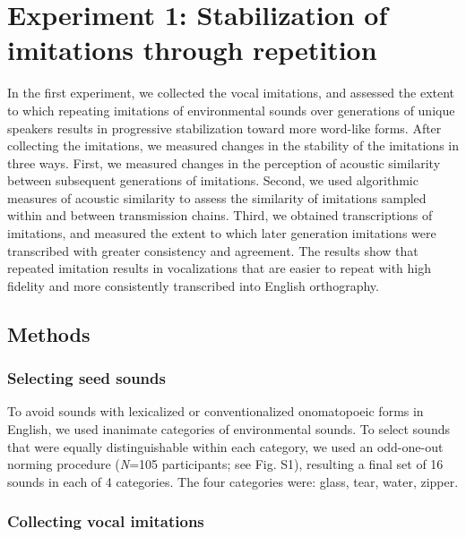 \documentclass[english,floatsintext,man]{apa6}
\theoremstyle{definition}
\theoremstyle{definition}
\theoremstyle{definition}
\theoremstyle{remark}
\begin{document}
\hypertarget{experiment-1-stabilization-of-imitations-through-repetition}{%
\section{Experiment 1: Stabilization of imitations through
repetition}\label{experiment-1-stabilization-of-imitations-through-repetition}}

In the first experiment, we collected the vocal imitations, and assessed
the extent to which repeating imitations of environmental sounds over
generations of unique speakers results in progressive stabilization
toward more word-like forms. After collecting the imitations, we
measured changes in the stability of the imitations in three ways.
First, we measured changes in the perception of acoustic similarity
between subsequent generations of imitations. Second, we used
algorithmic measures of acoustic similarity to assess the similarity of
imitations sampled within and between transmission chains. Third, we
obtained transcriptions of imitations, and measured the extent to which
later generation imitations were transcribed with greater consistency
and agreement. The results show that repeated imitation results in
vocalizations that are easier to repeat with high fidelity and more
consistently transcribed into English orthography.

\hypertarget{methods}{%
\subsection{Methods}\label{methods}}

\hypertarget{selecting-seed-sounds}{%
\subsubsection{Selecting seed sounds}\label{selecting-seed-sounds}}

To avoid sounds with lexicalized or conventionalized onomatopoeic forms
in English, we used inanimate categories of environmental sounds. To
select sounds that were equally distinguishable within each category, we
used an odd-one-out norming procedure (\emph{N}=105 participants; see
Fig. S1), resulting a final set of 16 sounds in each of 4 categories.
The four categories were: glass, tear, water, zipper.

\hypertarget{collecting-vocal-imitations}{%
\subsubsection{Collecting vocal
imitations}\label{collecting-vocal-imitations}}
\end{document}
